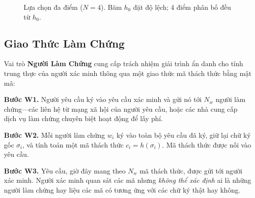 \documentclass[11pt,a4paper,twocolumn]{article}
\begin{document}
\begin{figure}[ht]
\centering
{}
\caption{Lựa chọn đa điểm ($N{=}4$). Băm $h_0$ đặt độ lệch; 4 điểm phân bố đều từ $h_0$.}
\label{fig:multipoint}
\end{figure}

\subsection{Giao Thức Làm Chứng}

Vai trò \textbf{Người Làm Chứng} cung cấp trách nhiệm giải trình ẩn danh cho tính trung thực của người xác minh thông qua một giao thức mã thách thức bằng mật mã:

\textbf{Bước W1.} Người yêu cầu ký vào yêu cầu xác minh và gửi nó tới $N_w$ người làm chứng---các liên hệ từ mạng xã hội của người yêu cầu, hoặc các nhà cung cấp dịch vụ làm chứng chuyên biệt hoạt động để lấy phí.

\textbf{Bước W2.} Mỗi người làm chứng $w_i$ ký vào toàn bộ yêu cầu đã ký, giữ lại chữ ký gốc $\sigma_i$, và tính toán một mã thách thức $c_i = h(\sigma_i)$. Mã thách thức được nối vào yêu cầu.

\textbf{Bước W3.} Yêu cầu, giờ đây mang theo $N_w$ mã thách thức, được gửi tới người xác minh. Người xác minh quan sát các mã nhưng \emph{không thể xác định} ai là những người làm chứng hay liệu các mã có tương ứng với các chữ ký thật hay không.
\end{document}

